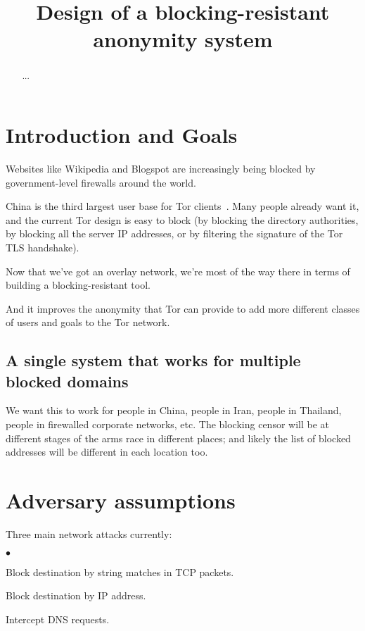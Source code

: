 \documentclass{llncs}
\newenvironment{tightlist}{\begin{list}{$\bullet$}{
  \setlength{\itemsep}{0mm}
    \setlength{\parsep}{0mm}
    }}{\end{list}}
\begin{document}
\title{Design of a blocking-resistant anonymity system}

\author{}

\maketitle
\pagestyle{plain}

\begin{abstract}

...

\end{abstract}

\section{Introduction and Goals}

Websites like Wikipedia and Blogspot are increasingly being blocked by
government-level firewalls around the world.

China is the third largest user base for Tor clients~\cite{geoip-tor}.
Many people already want it, and the current Tor design is easy to block
(by blocking the directory authorities, by blocking all the server
IP addresses, or by filtering the signature of the Tor TLS handshake).

Now that we've got an overlay network, we're most of the way there in
terms of building a blocking-resistant tool.

And it improves the anonymity that Tor can provide to add more different
classes of users and goals to the Tor network.

\subsection{A single system that works for multiple blocked domains}

We want this to work for people in China, people in Iran, people in
Thailand, people in firewalled corporate networks, etc. The blocking
censor will be at different stages of the arms race in different places;
and likely the list of blocked addresses will be different in each
location too.


\section{Adversary assumptions}
\label{sec:adversary}

Three main network attacks currently:

\begin{tightlist}
\item Block destination by string matches in TCP packets.

\item Block destination by IP address.

\item Intercept DNS requests.
\end{tightlist}
\end{document}
